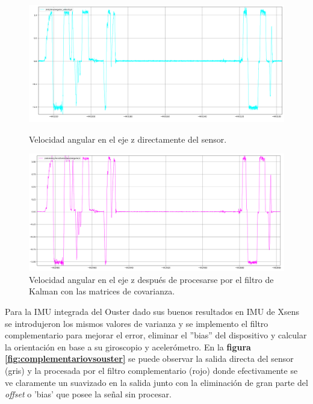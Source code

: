 \begin{figure}[htbp]
  \centering
  \begin{minipage}[b]{0.45\textwidth}
    \centering
    \includegraphics[width=\textwidth]{images/mti_angular_covariances.png}
    \caption{Velocidad angular en el eje z directamente del sensor.}
    \label{fig:mti_angular_cov}
  \end{minipage}
  \hfill
  \begin{minipage}[b]{0.45\textwidth}
    \centering
    \includegraphics[width=\textwidth]{images/odometry_local_angular_cov.png}
    \caption{Velocidad angular en el eje z después de procesarse por el filtro de Kalman con las matrices de covarianza.}
    \label{fig:odometry_local_cov}
  \end{minipage}
\end{figure}

Para la IMU integrada del Ouster dado sus buenos resultados en IMU de Xsens se introdujeron los mismos valores de varianza y se implemento el filtro complementario 
para mejorar el error, eliminar el ''bias'' del dispositivo y calcular la orientación en base a su giroscopio y acelerómetro. En la 
\textbf{figura \ref{fig:complementariovsouster}} se puede observar la salida directa del sensor (gris) y la procesada por el filtro complementario (rojo) donde efectivamente 
se ve claramente un suavizado en la salida junto con la eliminación de gran parte del \textit{offset} o 'bias' que posee la señal sin procesar.

